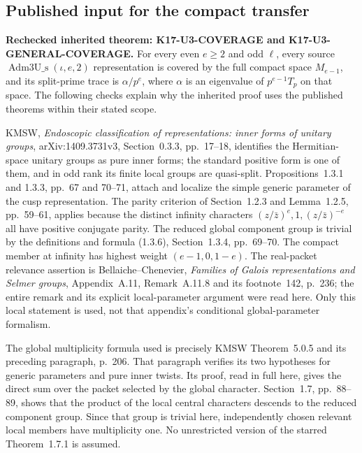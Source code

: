 \documentclass[11pt,a4paper]{article}
\theoremstyle{definition}
\renewcommand{\paragraph}[1]{\par\smallskip\noindent\textbf{#1}\quad\ignorespaces}
\begin{document}
\subsection{Published input for the compact transfer}

\paragraph{Rechecked inherited theorem: K17-U3-COVERAGE and
K17-U3-GENERAL-COVERAGE.}
For every even $e\geq2$ and odd $\ell$, every source
$\operatorname{Adm3U\_s}(\iota,e,2)$ representation is covered
by the full compact space $M_{e-1}$, and its split-prime trace is
$\alpha/p^e$, where $\alpha$ is an eigenvalue of
$p^{e-1}T_p$ on that space.
The following checks explain why the inherited proof uses the
published theorems within their stated scope.

KMSW, \emph{Endoscopic classification of representations: inner forms
of unitary groups}, arXiv:1409.3731v3, Section~0.3.3, pp.~17--18,
identifies the Hermitian-space unitary groups as pure inner forms;
the standard positive form is one of them, and in odd rank its finite
local groups are quasi-split.
Propositions~1.3.1 and 1.3.3, pp.~67 and 70--71, attach and localize
the simple generic parameter of the cusp representation.
The parity criterion of Section~1.2.3 and Lemma~1.2.5, pp.~59--61,
applies because the distinct infinity characters
$(z/\bar z)^e,1,(z/\bar z)^{-e}$ all have positive conjugate parity.
The reduced global component group is trivial by the definitions
and formula (1.3.6), Section~1.3.4, pp.~69--70.
The compact member at infinity has highest weight $(e-1,0,1-e)$.
The real-packet relevance assertion is Bellaiche--Chenevier,
\emph{Families of Galois representations and Selmer groups},
Appendix~A.11, Remark~A.11.8 and its footnote~142, p.~236;
the entire remark and its explicit local-parameter argument were
read here. Only this local statement is used, not that appendix's
conditional global-parameter formalism.

The global multiplicity formula used is precisely KMSW
Theorem~5.0.5 and its preceding paragraph, p.~206.
That paragraph verifies its two hypotheses for generic parameters
and pure inner twists. Its proof, read in full here, gives the
direct sum over the packet selected by the global character.
Section~1.7, pp.~88--89, shows that the product of the local central
characters descends to the reduced component group. Since that
group is trivial here, independently chosen relevant local members
have multiplicity one.
No unrestricted version of the starred Theorem~1.7.1 is assumed.
\end{document}
